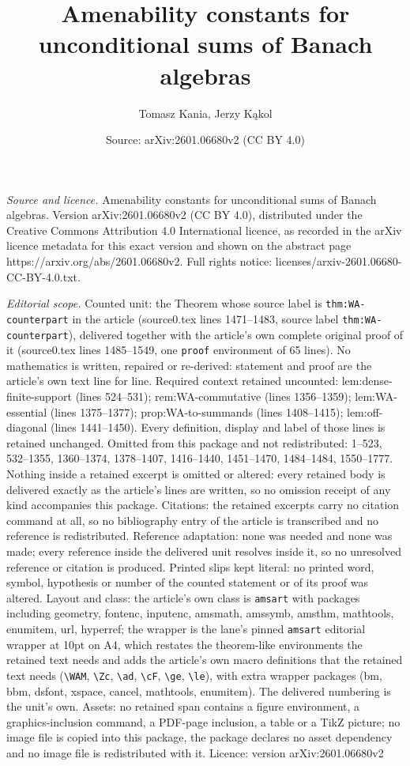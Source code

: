 \documentclass[10pt,a4paper]{amsart}
\title[Amenability constants for unconditional sums of Banach algeb]{Amenability constants for unconditional sums of Banach algebras}
\author{Tomasz Kania, Jerzy K\k{a}kol}
\date{Source: arXiv:2601.06680v2 (CC BY 4.0)}
\begin{document}
\maketitle

\noindent\emph{Source and licence.} Amenability constants for unconditional sums of Banach algebras. Version arXiv:2601.06680v2 (CC BY 4.0), distributed under the Creative Commons Attribution 4.0 International licence, as recorded in the arXiv licence metadata for this exact version and shown on the abstract page https://arxiv.org/abs/2601.06680v2. Full rights notice: licenses/arxiv-2601.06680-CC-BY-4.0.txt.\par\smallskip

\noindent\textit{Editorial scope.} Counted unit: the Theorem whose source label is \texttt{thm:WA-counterpart} in the article (source0.tex lines 1471--1483, source label \texttt{thm:WA-counterpart}), delivered together with the article's own complete original proof of it (source0.tex lines 1485--1549, one \texttt{proof} environment of 65 lines). No mathematics is written, repaired or re-derived: statement and proof are the article's own text line for line. Required context retained uncounted: lem:dense-finite-support (lines 524--531); rem:WA-commutative (lines 1356--1359); lem:WA-essential (lines 1375--1377); prop:WA-to-summands (lines 1408--1415); lem:off-diagonal (lines 1441--1450). Every definition, display and label of those lines is retained unchanged. Omitted from this package and not redistributed: 1--523, 532--1355, 1360--1374, 1378--1407, 1416--1440, 1451--1470, 1484--1484, 1550--1777. Nothing inside a retained excerpt is omitted or altered: every retained body is delivered exactly as the article's lines are written, so no omission receipt of any kind accompanies this package. Citations: the retained excerpts carry no citation command at all, so no bibliography entry of the article is transcribed and no reference is redistributed. Reference adaptation: none was needed and none was made; every reference inside the delivered unit resolves inside it, so no unresolved reference or citation is produced. Printed slips kept literal: no printed word, symbol, hypothesis or number of the counted statement or of its proof was altered. Layout and class: the article's own class is \texttt{amsart} with packages including geometry, fontenc, inputenc, amsmath, amssymb, amsthm, mathtools, enumitem, url, hyperref; the wrapper is the lane's pinned \texttt{amsart} editorial wrapper at 10pt on A4, which restates the theorem-like environments the retained text needs and adds the article's own macro definitions that the retained text needs (\texttt{\textbackslash WAM}, \texttt{\textbackslash Zc}, \texttt{\textbackslash ad}, \texttt{\textbackslash cF}, \texttt{\textbackslash ge}, \texttt{\textbackslash le}), with extra wrapper packages (bm, bbm, dsfont, xspace, cancel, mathtools, enumitem). The delivered numbering is the unit's own. Assets: no retained span contains a figure environment, a graphics-inclusion command, a PDF-page inclusion, a table or a TikZ picture; no image file is copied into this package, the package declares no asset dependency and no image file is redistributed with it. Licence: version arXiv:2601.06680v2 
\end{document}
